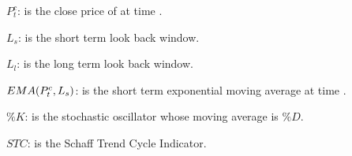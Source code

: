 \documentclass{article}
\begin{document}
$P_{t}^{c}$: is the close price of at time \currenttime.

$L_{s}$: is the short term look back window.

$L_{l}$: is the long term look back window.

$EMA(P_{t}^{c}, L_{s})$: is the short term exponential moving average at time \currenttime.

$\%K$: is the stochastic oscillator whose moving average is $\%D$.

$STC$: is the Schaff Trend Cycle Indicator.

\keyterms
\furtherlinks %
\end{document}
